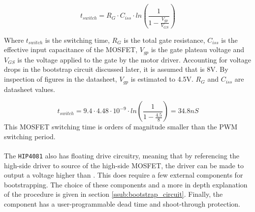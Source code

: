 \begin{equation}
t_{switch} = R_G \cdot C_{iss} \cdot ln\left(\frac{1}{1-\frac{V_{gp}}{V_{GS}}}\right) 
\label{eq:mosfet_turn_on}
\end{equation}

Where $t_{switch}$ is the switching time, $R_G$ is the total gate resistance, $C_{iss}$ is the effective input capacitance of the
MOSFET, $V_{gp}$ is the gate plateau voltage and $V_{GS}$ is the voltage applied to the gate by the motor driver.
Accounting for voltage drops in the bootstrap circuit discussed later,  it is assumed that \vgs is 8V.
By inspection of figures in the datasheet, $V_{gp}$ is estimated to 4.5V.
$R_G$ and $C_{iss}$ are datasheet values.

\begin{equation}
t_{switch} = 9.4 \cdot 4.48 \cdot 10^{-9} \cdot ln\left(\frac{1}{1-\frac{4.5}{8}}\right) = 34.8 nS 
\label{eq:mosfet_turn_on_values}
\end{equation}
This MOSFET switching time is orders of magnitude smaller than the PWM switching period.
\\~\\
The \texttt{HIP4081} also has floating drive circuitry, meaning that by referencing the high-side driver to source of the high-side MOSFET, the driver can be made to output a voltage higher than \vcc.
This does require a few external components for bootstrapping.
The choice of these components and a more in depth explanation of the procedure is given in section \ref{ssub:bootstrap_circuit}.
Finally, the component has a user-programmable dead time and shoot-through protection. 

